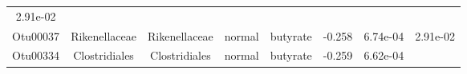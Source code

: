 \documentclass[11pt,]{article}
\begin{document}
\begin{longtable}[]{@{}cccccccc@{}}
\begin{minipage}[t]{0.08\columnwidth}
2.91e-02\strut
\end{minipage}\tabularnewline
\begin{minipage}[t]{0.08\columnwidth}\centering\strut
Otu00037\strut
\end{minipage} & \begin{minipage}[t]{0.15\columnwidth}\centering\strut
Rikenellaceae\strut
\end{minipage} & \begin{minipage}[t]{0.15\columnwidth}\centering\strut
Rikenellaceae\strut
\end{minipage} & \begin{minipage}[t]{0.08\columnwidth}\centering\strut
normal\strut
\end{minipage} & \begin{minipage}[t]{0.09\columnwidth}\centering\strut
butyrate\strut
\end{minipage} & \begin{minipage}[t]{0.07\columnwidth}\centering\strut
-0.258\strut
\end{minipage} & \begin{minipage}[t]{0.08\columnwidth}\centering\strut
6.74e-04\strut
\end{minipage} & \begin{minipage}[t]{0.08\columnwidth}\centering\strut
2.91e-02\strut
\end{minipage}\tabularnewline
\begin{minipage}[t]{0.08\columnwidth}\centering\strut
Otu00334\strut
\end{minipage} & \begin{minipage}[t]{0.15\columnwidth}\centering\strut
Clostridiales\strut
\end{minipage} & \begin{minipage}[t]{0.15\columnwidth}\centering\strut
Clostridiales\strut
\end{minipage} & \begin{minipage}[t]{0.08\columnwidth}\centering\strut
normal\strut
\end{minipage} & \begin{minipage}[t]{0.09\columnwidth}\centering\strut
butyrate\strut
\end{minipage} & \begin{minipage}[t]{0.07\columnwidth}\centering\strut
-0.259\strut
\end{minipage} & \begin{minipage}[t]{0.08\columnwidth}\centering\strut
6.62e-04\strut
\end{minipage} & \begin{minipage}[t]{0.08\columnwidth}\centering\strut

\end{minipage}
\end{longtable}
\end{document}
